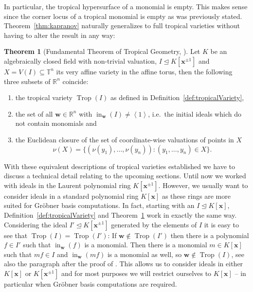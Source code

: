 \documentclass[
  paper=a4,
  titlepage,
  bibliography=totoc,
  pagesize=pdftex
]{scrartcl}
\numberwithin{figure}{section}
\numberwithin{equation}{section}
\numberwithin{table}{section}
\newcommand*\setR{\mathds{R}}
\newcommand*\setT{\mathds{T}}
\newcommand*\ideal[1]{\left\langle #1 \right\rangle}
\let\vec\mathbf
\let\idealof\trianglelefteq
\DeclareMathOperator{\Trop}{Trop}
\DeclareMathOperator{\initial}{in}
\theoremstyle{definition}
\newtheorem{theorem}[definition]{Theorem}
\numberwithin{definition}{section}
\begin{document}
In particular, the tropical hypersurface of a monomial is empty. This makes sense since
the corner locus of a tropical monomial is empty as was previously stated.
Theorem~\ref{thm:kapranov} naturally generalizes to full tropical varieties without having
to alter the result in any way:

\begin{theorem}[Fundamental Theorem of Tropical Geometry,
  {\cite[Theorem~3.2.5]{sturmMacTrop}}] \label{thm:fundamentalThm}
  Let $K$ be an algebraically closed field with non-trivial valuation, $I \idealof K[\vec
  x^{\pm1}]$ and $X = V(I) \subseteq \setT^n$ its very affine variety in the affine torus,
  then the following three subsets of $\setR^n$ coincide:
  \begin{enumerate}
    \item the tropical variety $\Trop(I)$ as defined in
      Definition~\ref{def:tropicalVariety},
    \item the set of all $\vec w \in \setR^n$ with $\initial_{\vec w}(I) \neq \ideal1$,
      i.e.\ the initial ideals which do not contain monomials and
    \item \label{thm:fund:val}
      the Euclidean closure of the set of coordinate-wise valuations of points in $X$
      \[
        \nu(X) = \{ (\nu(y_1), \dots, \nu(y_n)) : (y_1, \dots, y_n) \in X \}.
      \]
  \end{enumerate}
\end{theorem}

With these equivalent descriptions of tropical varieties established we have to discuss a
technical detail relating to the upcoming sections. Until now we worked with ideals in the
Laurent polynomial ring $K[\vec x^{\pm1}]$. However, we usually want to consider ideals in
a standard polynomial ring $K[\vec x]$ as these rings are more suited for Gröbner basis
computations. In fact, starting with an $I \idealof K[\vec x]$,
Definition~\ref{def:tropicalVariety} and Theorem~\ref{thm:fundamentalThm} work in exactly
the same way. Considering the ideal $I' \idealof K[\vec x^{\pm1}]$ generated by the
elements of $I$ it is easy to see that $\Trop(I) = \Trop(I')$: If $\vec w \not\in
\Trop(I')$ then there is a polynomial $f \in I'$ such that $\initial_{\vec w}(f)$ is a
monomial. Then there is a monomial $m \in K[\vec x]$ such that $mf \in I$ and
$\initial_{\vec w}(mf)$ is a monomial as well, so $\vec w \not\in \Trop(I)$, see also the
paragraph after the proof of \cite[Corollary~3.3]{compTropVar}. This allows us to consider
ideals in either $K[\vec x]$ or $K[\vec x^{\pm1}]$ and for most purposes we will restrict
ourselves to $K[\vec x]$ -- in particular when Gröbner basis computations are required.
\end{document}
